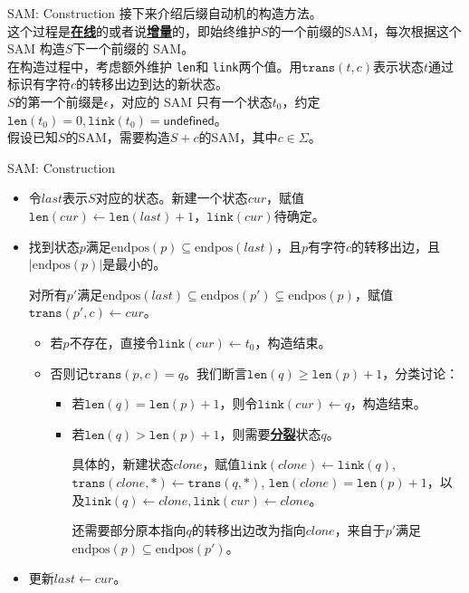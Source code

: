 \documentclass{beamer}
\theoremstyle{compact}
\def\obj#1{\textbf{\uline{#1}}}
\def\ge{\geqslant}
\def\endpos{\textrm{endpos}}
\def\link{\texttt{link}}
\def\len{\texttt{len}}
\def\tr{\texttt{trans}}
\begin{document}
\begin{frame}{SAM: Construction}
	接下来介绍后缀自动机的构造方法。\\
	
	这个过程是\obj{在线}的或者说\obj{增量}的，即始终维护$S$的一个前缀的SAM，每次根据这个 SAM 构造$S$下一个前缀的 SAM。\\

	在构造过程中，考虑额外维护 \len 和 \link 两个值。用$\tr(t, c)$表示状态$t$通过标识有字符$c$的转移出边到达的新状态。\\

	$S$的第一个前缀是$\epsilon$，对应的 SAM 只有一个状态$t_0$，约定$\len(t_0) = 0, \link(t_0) = \textsf{undefined}$。\\

	假设已知$S$的SAM，需要构造$S+c$的SAM，其中$c \in \Sigma$。

\end{frame}
\begin{frame}{SAM: Construction}
	\begin{itemize}
		\item 令$last$表示$S$对应的状态。新建一个状态$cur$，赋值$\len(cur) \gets \len(last) + 1$，$\link(cur)$待确定。
		\item 找到状态$p$满足$\endpos(p) \subseteq \endpos(last)$，且$p$有字符$c$的转移出边，且$|\endpos(p)|$是最小的。
		
		对所有$p'$满足$\endpos(last) \subseteq \endpos(p') \subsetneq \endpos(p)$，赋值$\tr(p', c) \gets cur$。
		\begin{itemize}
			\item 若$p$不存在，直接令$\link(cur) \gets t_0$，构造结束。
			\item 否则记$\tr(p, c) = q$。我们断言$\len(q) \ge \len(p) + 1$，分类讨论：
			\begin{itemize}
				\item 若$\len(q) = \len(p) + 1$，则令$\link(cur) \gets q$，构造结束。
				\item 若$\len(q) > \len(p) + 1$，则需要\obj{分裂}状态$q$。
				
				具体的，新建状态$clone$，赋值$\link(clone) \gets \link(q)$, $\tr(clone, *) \gets \tr(q, *)$, $\len(clone) = \len(p) + 1$，以及$\link(q) \gets clone, \link(cur) \gets clone$。

				还需要部分原本指向$q$的转移出边改为指向$clone$，来自于$p'$满足$\endpos(p) \subseteq \endpos(p')$。
			\end{itemize}
		\end{itemize}
		\item 更新$last \gets cur$。
	\end{itemize}
\end{frame}
\end{document}
